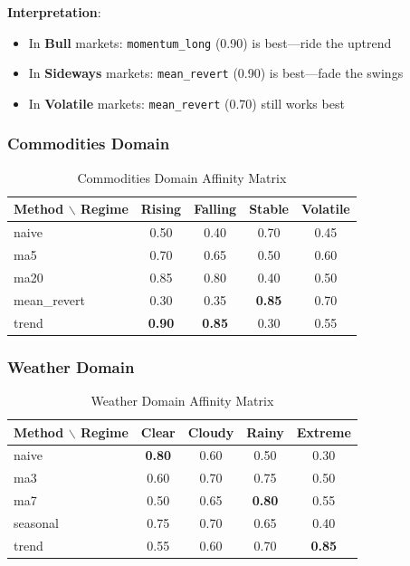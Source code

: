 \documentclass[11pt,a4paper]{article}
\theoremstyle{definition}
\theoremstyle{plain}
\begin{document}
\textbf{Interpretation}:
\begin{itemize}
    \item In \textbf{Bull} markets: \texttt{momentum\_long} (0.90) is best---ride the uptrend
    \item In \textbf{Sideways} markets: \texttt{mean\_revert} (0.90) is best---fade the swings
    \item In \textbf{Volatile} markets: \texttt{mean\_revert} (0.70) still works best
\end{itemize}

\subsubsection{Commodities Domain}

\begin{table}[h]
\centering
\caption{Commodities Domain Affinity Matrix}
\begin{tabular}{l|cccc}
\toprule
Method $\backslash$ Regime & Rising & Falling & Stable & Volatile \\
\midrule
naive & 0.50 & 0.40 & 0.70 & 0.45 \\
ma5 & 0.70 & 0.65 & 0.50 & 0.60 \\
ma20 & 0.85 & 0.80 & 0.40 & 0.50 \\
mean\_revert & 0.30 & 0.35 & \textbf{0.85} & 0.70 \\
trend & \textbf{0.90} & \textbf{0.85} & 0.30 & 0.55 \\
\bottomrule
\end{tabular}
\end{table}

\subsubsection{Weather Domain}

\begin{table}[h]
\centering
\caption{Weather Domain Affinity Matrix}
\begin{tabular}{l|cccc}
\toprule
Method $\backslash$ Regime & Clear & Cloudy & Rainy & Extreme \\
\midrule
naive & \textbf{0.80} & 0.60 & 0.50 & 0.30 \\
ma3 & 0.60 & 0.70 & 0.75 & 0.50 \\
ma7 & 0.50 & 0.65 & \textbf{0.80} & 0.55 \\
seasonal & 0.75 & 0.70 & 0.65 & 0.40 \\
trend & 0.55 & 0.60 & 0.70 & \textbf{0.85} \\
\bottomrule
\end{tabular}
\end{table}
\end{document}
